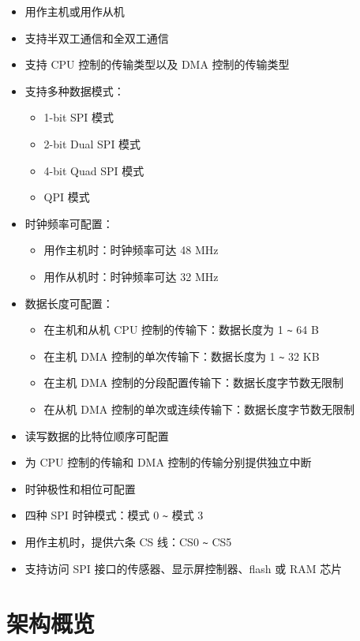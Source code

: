 \documentclass[main\_\_CN.tex]{subfiles}
\begin{document}
\begin{itemize}
    \item 用作主机或用作从机
    \item 支持半双工通信和全双工通信
    \item 支持 CPU 控制的传输类型以及 DMA 控制的传输类型
    \item 支持多种数据模式：
        \begin{itemize}
            \item 1-bit SPI 模式
            \item 2-bit Dual SPI 模式
            \item 4-bit Quad SPI 模式
            \item QPI 模式
        \end{itemize}
    \item 时钟频率可配置：
        \begin{itemize}
        \item 用作主机时：时钟频率可达 48 MHz
            \item 用作从机时：时钟频率可达 32 MHz
        \end{itemize}
    \item 数据长度可配置：
    \begin{itemize}
        \item 在主机和从机 CPU 控制的传输下：数据长度为 1 \verb+~+ 64 B
        \item 在主机 DMA 控制的单次传输下：数据长度为 1 \verb+~+ 32 KB
        \item 在主机 DMA 控制的分段配置传输下：数据长度字节数无限制
        \item 在从机 DMA 控制的单次或连续传输下：数据长度字节数无限制
    \end{itemize}
    \item 读写数据的比特位顺序可配置
    \item 为 CPU 控制的传输和 DMA 控制的传输分别提供独立中断
    \item 时钟极性和相位可配置
    \item 四种 SPI 时钟模式：模式 0 \verb+~+ 模式 3
    \item 用作主机时，提供六条 CS 线：CS0 \verb+~+ CS5
    \item 支持访问 SPI 接口的传感器、显示屏控制器、flash 或 RAM 芯片
\end{itemize}

\section{架构概览}
\end{document}
